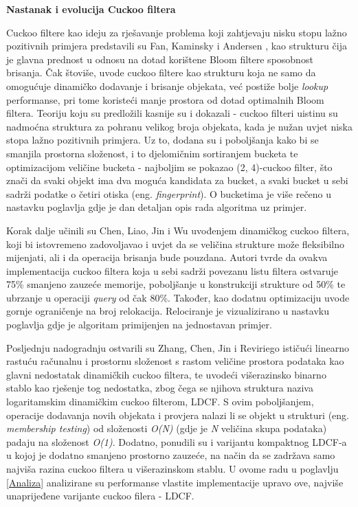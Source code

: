 \documentclass[times, utf8, seminar, numeric]{fer}
\begin{document}
\begin{flushleft}
\textbf{Nastanak i evolucija Cuckoo filtera}
\end{flushleft}

Cuckoo filtere kao ideju za rješavanje problema koji zahtjevaju nisku stopu lažno pozitivnih primjera predstavili su Fan, Kaminsky i Andersen \cite{DBLP:journals/usenix-login/FanAK13}, kao strukturu čija je glavna prednost u odnosu na dotad korištene Bloom filtere sposobnost brisanja. Čak štoviše, uvode cuckoo filtere kao strukturu koja ne samo da omogućuje dinamičko dodavanje i brisanje objekata, već postiže bolje \textit{lookup} performanse, pri tome koristeći manje prostora od dotad optimalnih Bloom filtera.
Teoriju koju su predložili kasnije su i dokazali \cite{10.1145/2674005.2674994} - cuckoo filteri uistinu su nadmoćna struktura za pohranu velikog broja objekata, kada je nužan uvjet niska stopa lažno pozitivnih primjera. Uz to, dodana su i poboljšanja kako bi se smanjila prostorna složenost, i to djelomičnim sortiranjem bucketa te optimizacijom veličine bucketa - najboljim se pokazao (2, 4)-cuckoo filter, što znači da svaki objekt ima dva moguća kandidata za bucket, a svaki bucket u sebi sadrži podatke o četiri otiska (eng. \textit{fingerprint}). O bucketima je više rečeno u nastavku poglavlja gdje je dan detaljan opis rada algoritma uz primjer.

Korak dalje učinili su Chen, Liao, Jin i Wu \cite{8117563} uvođenjem dinamičkog cuckoo filtera, koji bi istovremeno zadovoljavao i uvjet da se veličina strukture može fleksibilno mijenjati, ali i da operacija brisanja bude pouzdana. Autori tvrde da ovakva implementacija cuckoo filtera koja u sebi sadrži povezanu listu filtera ostvaruje 75\% smanjeno zauzeće memorije, poboljšanje u konstrukciji strukture od 50\% te ubrzanje u operaciji \textit{query} od čak 80\%. Također, kao dodatnu optimizaciju uvode gornje ograničenje na broj relokacija. Relociranje je vizualizirano u nastavku poglavlja gdje je algoritam primijenjen na jednostavan primjer.

Posljednju nadogradnju ostvarili su Zhang, Chen, Jin i Reviriego \cite{9458864} ističući linearno rastuću računalnu i prostornu složenost s rastom veličine prostora podataka kao glavni nedostatak dinamičkih cuckoo filtera, te uvodeći višerazinsko binarno stablo kao rješenje tog nedostatka, zbog čega se njihova struktura naziva logaritamskim dinamičkim cuckoo filterom, LDCF. S ovim poboljšanjem, operacije dodavanja novih objekata i provjera nalazi li se objekt u strukturi (eng. \textit{membership testing}) od složenosti \textit{O(N)} (gdje je \textit{N} veličina skupa podataka) padaju na složenost \textit{O(1)}. Dodatno, ponudili su i varijantu kompaktnog LDCF-a u kojoj je dodatno smanjeno prostorno zauzeće, na način da se zadržava samo najviša razina cuckoo filtera u višerazinskom stablu. U ovome radu u poglavlju \ref{Analiza} analizirane su performanse vlastite implementacije upravo ove, najviše unaprijeđene varijante cuckoo filera - LDCF.
\end{document}
